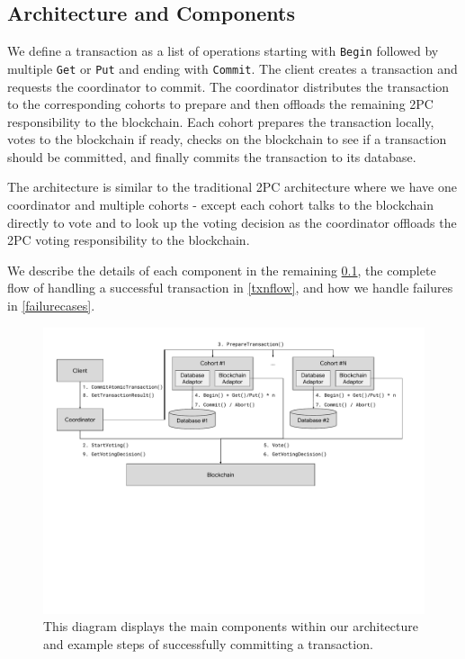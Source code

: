 \documentclass[11pt,conference]{IEEEtran}
\begin{document}
\subsection{Architecture and Components} \label{components}

We define a transaction as a list of operations starting with \texttt{Begin} followed by multiple \texttt{Get} or \texttt{Put} and ending with \texttt{Commit}. The client creates a transaction and requests the coordinator to commit. The coordinator distributes the transaction to the corresponding cohorts to prepare and then offloads the remaining 2PC responsibility to the blockchain. Each cohort prepares the transaction locally, votes to the blockchain if ready, checks on the blockchain to see if a transaction should be committed, and finally commits the transaction to its database.

The architecture is similar to the traditional 2PC architecture where we have one coordinator and multiple cohorts - except each cohort talks to the blockchain directly to vote and to look up the voting decision as the coordinator offloads the 2PC voting responsibility to the blockchain.

We describe the details of each component in the remaining \ref{components}, the complete flow of handling a successful transaction in \ref{txnflow}, and how we handle failures in \ref{failurecases}.

\begin{figure}
  \centering
  \includegraphics[width=\textwidth]{./diagram.pdf}
  \caption{This diagram displays the main components within our architecture and example steps of successfully committing a transaction.}
  \label{fig:Panel}
\end{figure}
\end{document}
